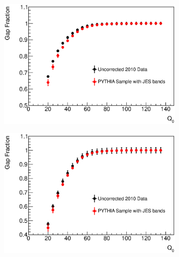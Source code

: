 \begin{figure}
\centering
        \begin{subfigure}[b]{0.5\textwidth}
                \centering
                \includegraphics[width=\textwidth]{figures/GBJ2/ControlPlots/Smeared2_3__Q0.eps}
        \end{subfigure}%
        \begin{subfigure}[b]{0.5\textwidth}
                \centering
                \includegraphics[width=\textwidth]{figures/GBJ2/ControlPlots/Smeared4_5__Q0.eps}
        \end{subfigure}%



\end{figure}
